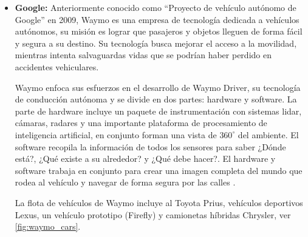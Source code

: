 \begin{itemize}
    \item \textbf{Google:}
    Anteriormente conocido como ``Proyecto de vehículo autónomo de Google'' en 2009, Waymo es una empresa de tecnología dedicada a vehículos autónomos, su misión es lograr que pasajeros y objetos lleguen de forma fácil y segura a su destino. Su tecnología busca mejorar el acceso a la movilidad, mientras intenta salvaguardas vidas que se podrían haber perdido en accidentes vehiculares.

    Waymo enfoca sus esfuerzos en el desarrollo de Waymo Driver, su tecnología de conducción autónoma y se divide en dos partes: hardware y software. La parte de hardware incluye un paquete de instrumentación con sistemas lidar, cámaras, radares y una importante plataforma de procesamiento de inteligencia artificial, en conjunto forman una vista de $360^{\circ}$ del ambiente. El software recopila la información de todos los sensores para saber ¿Dónde está?, ¿Qué existe a su alrededor? y ¿Qué debe hacer?. El hardware y software trabaja en conjunto para crear una imagen completa del mundo que rodea al vehículo y navegar de forma segura por las calles \cite{waymo}.

    La flota de vehículos de Waymo incluye al Toyota Prius, vehículos deportivos Lexus, un vehículo prototipo (Firefly) y camionetas híbridas Chrysler, ver \ref{fig:waymo_cars}.
\end{itemize}
